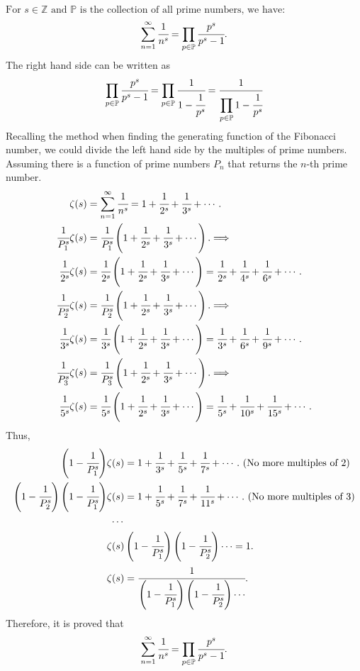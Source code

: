 \documentclass[aps,onecolumn,superscriptaddress,preprintnumbers]{revtex4-2}
\begin{document}
$\text{For~} s \in \mathbb{Z} \text{~and~} \mathbb{P} \text{~is the collection of all prime numbers, we have:}$
\begin{equation}
\sum_{n=1}^{\infty}\cfrac{1}{n^s} = \prod_{p\in\mathbb{P}} \cfrac{p^s}{p^s-1}.
\end{equation}
The right hand side can be written as
\begin{equation*}
\prod_{p\in\mathbb{P}} \cfrac{p^s}{p^s-1} = \prod_{p\in\mathbb{P}} \cfrac{1}{1-\cfrac{1}{p^s}}= \cfrac{1}{\displaystyle\prod_{p\in\mathbb{P}} 1-\cfrac{1}{p^s}}
\end{equation*}
Recalling the method when finding the generating function of the Fibonacci number, we could divide the left hand side by the multiples of prime numbers. Assuming there is a function of prime numbers $P_n$ that returns the $n$-th prime number.
\begin{align*}
\zeta{(s)} &= \sum_{n=1}^{\infty}\cfrac{1}{n^s} = 1+\cfrac{1}{2^s}+\cfrac{1}{3^s}+\cdots.\\
\cfrac{1}{P_1^s} \zeta{(s)} &= \cfrac{1}{P_1^s} \left(1+\cfrac{1}{2^s}+\cfrac{1}{3^s}+\cdots\right).\Longrightarrow\\
\cfrac{1}{2^s} \zeta{(s)} &= \cfrac{1}{2^s} \left(1+\cfrac{1}{2^s}+\cfrac{1}{3^s}+\cdots\right)=\cfrac{1}{2^s}+\cfrac{1}{4^s}+\cfrac{1}{6^s}+\cdots.\\
\cfrac{1}{P_2^s} \zeta{(s)} &= \cfrac{1}{P_2^s} \left(1+\cfrac{1}{2^s}+\cfrac{1}{3^s}+\cdots\right).\Longrightarrow\\
\cfrac{1}{3^s} \zeta{(s)} &= \cfrac{1}{3^s} \left(1+\cfrac{1}{2^s}+\cfrac{1}{3^s}+\cdots\right)=\cfrac{1}{3^s}+\cfrac{1}{6^s}+\cfrac{1}{9^s}+\cdots.\\
\cfrac{1}{P_3^s} \zeta{(s)} &= \cfrac{1}{P_3^s} \left(1+\cfrac{1}{2^s}+\cfrac{1}{3^s}+\cdots\right).\Longrightarrow\\
\cfrac{1}{5^s} \zeta{(s)} &= \cfrac{1}{5^s} \left(1+\cfrac{1}{2^s}+\cfrac{1}{3^s}+\cdots\right)=\cfrac{1}{5^s}+\cfrac{1}{10^s}+\cfrac{1}{15^s}+\cdots.
\end{align*}
Thus,
\begin{align*}
\left(1-\cfrac{1}{P_1^s}\right)&\zeta{(s)} = 1+\cfrac{1}{3^s}+\cfrac{1}{5^s}+\cfrac{1}{7^s}+\cdots. ~(\text{No more multiples of~} 2)\\
\left(1-\cfrac{1}{P_2^s}\right)\left(1-\cfrac{1}{P_1^s}\right)&\zeta{(s)} = 1+\cfrac{1}{5^s}+\cfrac{1}{7^s}+\cfrac{1}{11^s}+\cdots. ~(\text{No more multiples of~} 3)\\
&~\cdots\\
&\zeta{(s)}\left(1-\cfrac{1}{P_1^s}\right)\left(1-\cfrac{1}{P_2^s}\right)\cdots = 1.\\
&\zeta{(s)}=\cfrac{1}{\left(1-\cfrac{1}{P_1^s}\right)\left(1-\cfrac{1}{P_2^s}\right)\cdots}.
\end{align*}
Therefore, it is proved that $$\sum_{n=1}^{\infty}\cfrac{1}{n^s} = \prod_{p\in\mathbb{P}} \cfrac{p^s}{p^s-1}.$$
\end{document}
